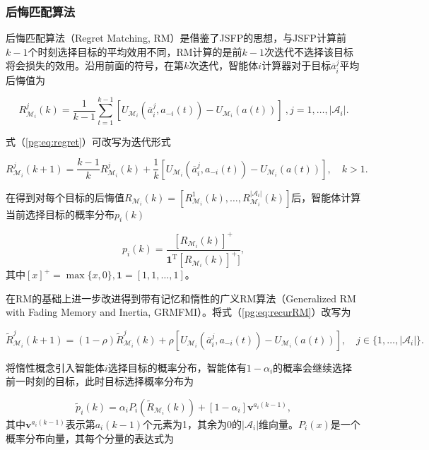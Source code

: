 \subsubsection{后悔匹配算法}
\label{pgta:protocal:RM}

后悔匹配算法（Regret Matching, RM）是借鉴了JSFP的思想，与JSFP计算前$k-1$个时刻选择目标的平均效用不同，RM计算的是前$k-1$次迭代不选择该目标将会损失的效用。沿用前面的符号，在第$k$次迭代，智能体$i$计算器对于目标$\overline a_i^j$平均后悔值为

\begin{equation}
\label{pg:eq:regret}
	R_{\mathcal{M}_i}^j(k) = \frac{1}{k-1}\sum_{t=1}^{k-1} [U_{\mathcal{M}_i}(\overline a_i^j, a_{-i}(t)) - U_{\mathcal{M}_i}(a(t))]\ ,j=1,\dots,|\mathcal{A}_i|.
\end{equation}

式（\ref{pg:eq:regret}）可改写为迭代形式

\begin{equation}
\label{pg:eq:recurRM}
	R_{\mathcal{M}_i}^j(k+1) = \frac{k-1}{k}R_{\mathcal{M}_i}^j(k) + \frac{1}{k} [U_{\mathcal{M}_i}(\overline a_i^j, a_{-i}(t)) - U_{\mathcal{M}_i}(a(t))],\quad k>1.
\end{equation}

在得到对每个目标的后悔值$R_{\mathcal{M}_i}(k)=[R_{\mathcal{M}_i}^1(k),\dots,R_{\mathcal{M}_i}^{|\mathcal{A}_i|}(k)]$后，智能体计算当前选择目标的概率分布$p_i(k)$

\begin{equation}
\label{pg:eq:rmpdf}
	p_i(k) = \frac{[R_{\mathcal{M}_i}(k)]^+}{{\bm 1}^{\mathrm T}[R_{\mathcal{M}_i}(k)]^+]},
\end{equation}
其中$[x]^+=\max\{x,0\},{\bm 1}=[1,1,\dots,1]$。

在RM的基础上进一步改进得到带有记忆和惰性的广义RM算法（Generalized RM with Fading Memory and Inertia, GRMFMI）。将式（\ref{pg:eq:recurRM}）改写为

\begin{equation}
	\widetilde R_{\mathcal{M}_i}^j(k+1) = (1-\rho)\widetilde R_{\mathcal{M}_i}^j(k) + \rho [U_{\mathcal{M}_i}(\overline a_i^j, a_{-i}(t)) - U_{\mathcal{M}_i}(a(t))],\quad j \in \{1,\dots,|\mathcal{A}_i|\}.
\end{equation}

将惰性概念引入智能体$i$选择目标的概率分布，智能体有$1-\alpha_i$的概率会继续选择前一时刻的目标，此时目标选择概率分布为

\begin{equation}
\label{pg:eq:interiapdf}
	\widetilde p_i(k) = \alpha_i P_i(\widetilde R_{\mathcal{M}_i}(k)) + [1-\alpha _i]{\bm v}^{a_i(k-1)},
\end{equation}
其中${\bm v}^{a_i(k-1)}$表示第$a_i(k-1)$个元素为1，其余为0的$|\mathcal{A}_i|$维向量。$P_i(x)$是一个概率分布向量，其每个分量的表达式为


